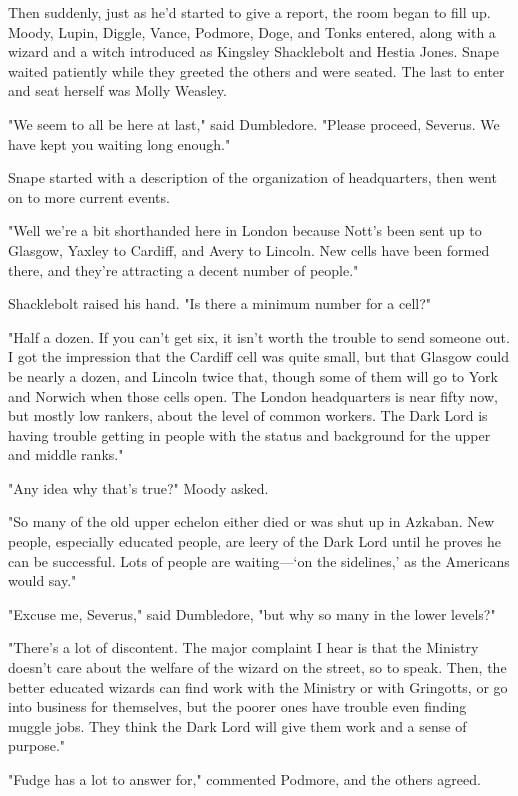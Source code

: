 Then suddenly, just as he'd started to give a report, the room began to fill up. Moody, Lupin, Diggle, Vance, Podmore, Doge, and Tonks entered, along with a wizard and a witch introduced as Kingsley Shacklebolt and Hestia Jones. Snape waited patiently while they greeted the others and were seated. The last to enter and seat herself was Molly Weasley.

"We seem to all be here at last," said Dumbledore. "Please proceed, Severus. We have kept you waiting long enough."

Snape started with a description of the organization of headquarters, then went on to more current events.

"Well{\el} we're a bit shorthanded here in{\el} London because Nott's been sent up to Glasgow, Yaxley to Cardiff, and Avery to Lincoln. New cells have been formed there, and they're attracting a decent number of people."

Shacklebolt raised his hand. "Is there a minimum number for a cell?"

"Half a dozen. If you can't get six, it isn't worth the trouble to send someone out. I got the impression that the Cardiff cell was quite small, but that Glasgow could be nearly a dozen, and Lincoln twice that, though some of them will go to York and Norwich when those cells open. The London headquarters is near fifty now, but mostly low rankers, about the level of common workers. The Dark Lord is having trouble getting in people with the status and background for the upper and middle ranks."

"Any idea why that's true?" Moody asked.

"So many of the old upper echelon either died or was shut up in Azkaban. New people, especially educated people, are leery of the Dark Lord until he proves he can be successful. Lots of people are waiting—`on the sidelines,' as the Americans would say."

"Excuse me, Severus," said Dumbledore, "but why so many in the lower levels?"

"There's a lot of discontent. The major complaint I hear is that the Ministry doesn't care about the welfare of the wizard on the street, so to speak. Then, the better educated wizards can find work with the Ministry or with Gringotts, or go into business for themselves, but the poorer ones have trouble even finding muggle jobs. They think the Dark Lord will give them work and a sense of purpose."

"Fudge has a lot to answer for," commented Podmore, and the others agreed.

